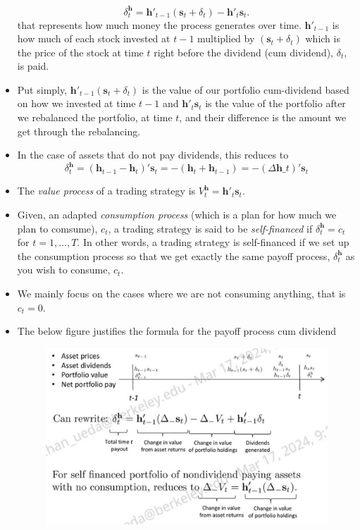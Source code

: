 \documentclass[11pt]{article}
\begin{document}
\begin{itemize}
    \[
    \delta_t^{\boldsymbol{h}} = \boldsymbol{h}'_{t-1}(\boldsymbol{s}_t + \delta_t) - 
    \boldsymbol{h}'_{t}\boldsymbol{s}_t.
    \]
    that represents how much money the process generates over time. $\boldsymbol{h}'_{t-1}$ is 
    how much of each stock invested at $t-1$ multiplied by $(\boldsymbol{s}_t + \delta_t)$ 
    which is the price of the stock at time $t$ right before the dividend (cum dividend), 
    $\delta_t$, is paid. 
    \item Put simply, $\boldsymbol{h}'_{t-1}(\boldsymbol{s}_t + \delta_t)$ is the value of our 
    portfolio cum-dividend based on how we invested at time $t-1$ and $\boldsymbol{h}'_{t}
    \boldsymbol{s}_t$ is the value of the portfolio after we rebalanced the portfolio, at time 
    $t$, and their difference is the amount we get through the rebalancing. 
    \item In the case of assets that do not pay dividends, this reduces to  
    \[
    \delta_t^{\boldsymbol{h}} = (\boldsymbol{h}_{t-1}-\boldsymbol{h}_{t})'\boldsymbol{s}_t
    = -(\boldsymbol{h}_{t} + \boldsymbol{h}_{t-1}) = -(\Delta \boldsymbol{h}\_{t})'
    \boldsymbol{s}_t
    \]   
    \item The \textit{value process} of a trading strategy is $V_t^{\boldsymbol{h}} = 
    \boldsymbol{h}'_{t}\boldsymbol{s}_t$.
    \item Given, an adapted \textit{consumption process} (which is a plan for how much we plan 
    to comsume), $c_t$, a trading strategy is said to be \textit{self-financed} if 
    $\delta_t^{\boldsymbol{h}} = c_t$ for $t=1, \ldots, T$. In other words, a trading strategy 
    is self-financed if we set up the consumption process so that we get exactly the same 
    payoff process, $\delta_t^{\boldsymbol{h}}$ as you wish to consume, $c_t$. 
    \item We mainly focus on the cases where we are not consuming anything, that is $c_t=0$. 
    \item The below figure justifies the formula for the payoff process cum dividend
    \begin{figure}[H] 
        \centering 
        \includegraphics[width=5in]{imgs/payoff_process_cum_div_justified.jpeg}

\end{figure}
\end{itemize}
\end{document}
